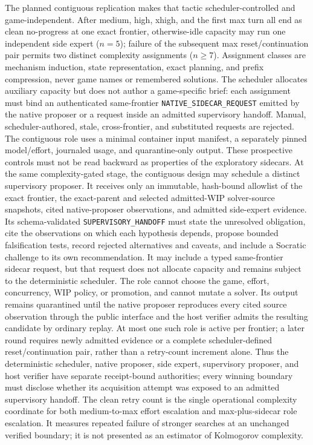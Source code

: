 \documentclass[11pt]{article}
\theoremstyle{definition}
\theoremstyle{remark}
\begin{document}
The planned contiguous replication makes that tactic scheduler-controlled and
game-independent. After medium, high, xhigh, and the first max turn all end as clean
no-progress at one exact frontier, otherwise-idle capacity may run one independent
side expert (\(n=5\)); failure of the subsequent max reset/continuation pair permits
two distinct complexity assignments (\(n\geq7\)). Assignment classes are mechanism induction, state
representation, exact planning, and prefix compression, never game names or remembered
solutions. The scheduler allocates auxiliary capacity but does not author a
game-specific brief: each assignment must bind an authenticated same-frontier
\texttt{NATIVE\_SIDECAR\_REQUEST} emitted by the native proposer or a request
inside an admitted supervisory handoff. Manual, scheduler-authored, stale,
cross-frontier, and substituted requests are rejected. The contiguous role uses a minimal container input manifest, a separately
pinned model/effort, journaled usage, and quarantine-only output. These prospective
controls must not be read backward as properties of the exploratory sidecars.
At the same complexity-gated stage, the contiguous design may schedule a distinct
supervisory proposer. It receives only an immutable, hash-bound allowlist of the exact
frontier, the exact-parent and selected admitted-WIP solver-source snapshots, cited
native-proposer observations, and admitted side-expert evidence. Its
schema-validated \texttt{SUPERVISORY\_HANDOFF} must state the unresolved obligation,
cite the observations on which each hypothesis depends, propose bounded falsification
tests, record rejected alternatives and caveats, and include a Socratic challenge to
its own recommendation. It may include a typed same-frontier sidecar request, but that
request does not allocate capacity and remains subject to the deterministic scheduler.
The role cannot choose the game, effort, concurrency, WIP
policy, or promotion, and cannot mutate a solver. Its output remains quarantined until
the native proposer reproduces every cited source observation through the public
interface and the host verifier admits the resulting candidate by ordinary replay. At
most one such role is active per
frontier; a later round requires newly admitted evidence or a complete scheduler-defined
reset/continuation pair, rather than a retry-count increment alone. Thus the deterministic
scheduler,
native proposer, side expert, supervisory proposer, and host verifier have separate
receipt-bound authorities; every winning boundary must disclose whether its acquisition
attempt was exposed to an admitted supervisory handoff.
The clean retry count is the single operational complexity coordinate for both
medium-to-max effort escalation and max-plus-sidecar role escalation. It measures
repeated failure of stronger searches at an unchanged verified boundary; it is not
presented as an estimator of Kolmogorov complexity.
\end{document}
